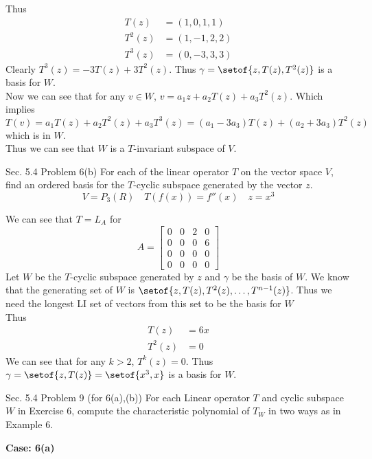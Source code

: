 \documentclass[answers,12pt,addpoints]{exam}
\begin{document}
\begin{questions}
\begin{solution}
        Thus 
        \begin{align*}
            T(z) &= (1,0,1,1)\\
            T^2(z) &= (1, -1, 2, 2)\\
            T^3(z) &= (0, -3, 3, 3)
        \end{align*}
        Clearly $T^3(z) = -3T(z) + 3T^2(z)$. Thus $\gamma = \setof{z, T(z), T^2(z)}$ is a basis for $W$.\\
        Now we can see that for any $v \in W$, $v = a_1z + a_2T(z) + a_3T^2(z)$. Which implies $T(v) = a_1T(z) + a_2T^2(z) + a_3T^3(z) = (a_1-3a_3)T(z) + (a_2+3a_3)T^2(z)$ which is in $W$. \\
        Thus we can see that $W$ is a $T$-invariant subspace of $V$. 
    \end{solution}
    \question Sec. 5.4 Problem 6(b)
    For each of the linear operator $T$ on the vector space $V$, find an ordered basis for the $T$-cyclic subspace generated by the vector $z$.\\
    $$ V = P_3(R) \quad T(f(x)) = f''(x) \quad z = x^3$$
    \begin{solution}
        We can see that $T = L_A$ for
        $$A = \begin{bmatrix}
            0 & 0 & 2 & 0\\
            0 & 0 & 0 & 6\\
            0 & 0 & 0 & 0\\
            0 & 0 & 0 & 0
        \end{bmatrix}$$
        Let $W$ be the $T$-cyclic subspace generated by $z$ and $\gamma$ be the basis of $W$. We know that the generating set of $W$ is $\setof{z, T(z), T^2(z), \ldots, T^{n-1}(z)}$. Thus we need the longest LI set of vectors from this set to be the basis for $W$\\
        Thus
        \begin{align*}
            T(z) &= 6x\\
            T^2(z) &= 0
        \end{align*}
        We can see that for any $k > 2$, $T^k(z) = 0$. Thus $\gamma = \setof{z, T(z)} = \setof{x^3, x}$ is a basis for $W$.
    \end{solution}
    \question Sec. 5.4 Problem 9 (for 6(a),(b))
    For each Linear operator $T$ and cyclic subspace $W$ in Exercise 6, compute the characteristic polynomial of $T_W$ in two ways as in Example $6$.
    \begin{solution}
        \textbf{Case: 6(a)}\\

\end{solution}
\end{questions}
\end{document}
